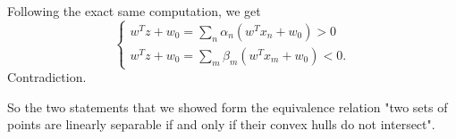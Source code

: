 Following the exact same computation, we get
\[\begin{cases}
w^Tz + w_0 = \sum_n\alpha_n\left(w^Tx_n + w_0\right) > 0 \\
w^Tz + w_0 = \sum_m\beta_m\left(w^Tx_m + w_0\right) < 0.
\end{cases}\]
Contradiction.

So the two statements that we showed form the equivalence relation "two sets of points are 
linearly separable if and only if their convex hulls do not intersect".
